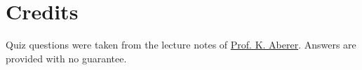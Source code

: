 \documentclass[12pt,a4paper,answers]{exam} %
\newcommand{\staff}{\href{http://people.epfl.ch//karl.aberer}{Prof. K. Aberer}}
\begin{document}
\section*{Credits}
Quiz questions were taken from the lecture notes of \staff. Answers are provided with no guarantee.%

%
\end{document}

